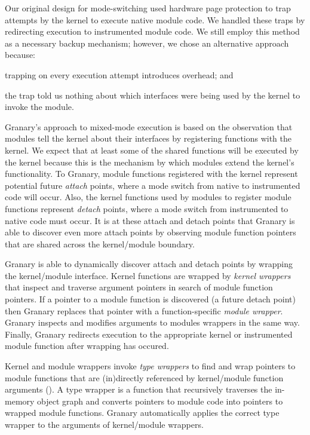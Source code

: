\documentclass{sigplanconf}
\newcommand{\comment}[1]{}
\begin{document}
Our original design for mode-switching used hardware page protection to trap attempts by the kernel to execute native module code. We handled these traps by redirecting execution to instrumented module code. We still employ this method as a necessary backup mechanism; however, we chose an alternative approach because: \begin{inparaenum}[i)]
	\item trapping on every execution attempt introduces overhead\comment{TODO: CITE eval section with wrappers disabled!!!}; and
	\item the trap told us nothing about which interfaces were being used by the kernel to invoke the module.
\end{inparaenum}

Granary's approach to mixed-mode execution is based on the observation that modules tell the kernel about their interfaces by registering functions with the kernel. We expect that at least some of the shared functions will be executed by the kernel because this is the mechanism by which modules extend the kernel's functionality. To Granary, module functions registered with the kernel represent potential future \emph{attach} points, where a mode switch from native to instrumented code will occur. Also, the kernel functions used by modules to register module functions represent \emph{detach} points, where a mode switch from instrumented to native code must occur. It is at these attach and detach points that Granary is able to discover even more attach points by observing module function pointers that are shared across the kernel/module boundary.

Granary is able to dynamically discover attach and detach points by wrapping the kernel/module interface. Kernel functions are wrapped by \emph{kernel wrappers} that inspect and traverse argument pointers in search of module function pointers. If a pointer to a module function is discovered (a future detach point) then Granary replaces that pointer with a function-specific \emph{module wrapper}. Granary inspects and modifies arguments to modules wrappers in the same way. Finally, Granary redirects execution to the appropriate kernel or instrumented module function after wrapping has occured.

Kernel and module wrappers invoke \emph{type wrappers} to find and wrap pointers to module functions that are (in)directly referenced by kernel/module function arguments (). A type wrapper is a function that recursively  traverses the in-memory object graph and converts pointers to module code into pointers to wrapped module functions.  Granary automatically applies the correct type wrapper to the arguments of kernel/module wrappers.
\end{document}
